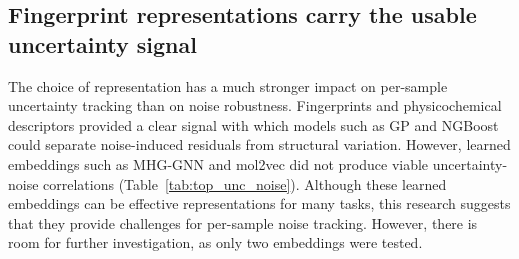 \subsection{Fingerprint representations carry the usable uncertainty signal}

The choice of representation has a much stronger impact on per-sample uncertainty tracking than on noise robustness. Fingerprints and physicochemical descriptors provided a clear signal with which models such as GP and NGBoost could separate noise-induced residuals from structural variation. However, learned embeddings such as MHG-GNN and mol2vec did not produce viable uncertainty-noise correlations (Table~\ref{tab:top_unc_noise}). Although these learned embeddings can be effective representations for many tasks, this research suggests that they provide challenges for per-sample noise tracking. However, there is room for further investigation, as only two embeddings were tested.

